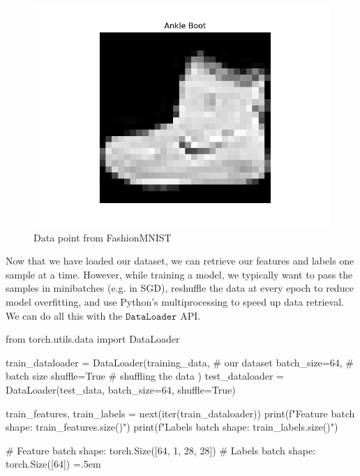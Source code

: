 \documentclass{article}
\newenvironment{cverbatim}
    {\SaveVerbatim{cverb}}
    {\endSaveVerbatim
      \flushleft\fboxrule=0pt\fboxsep=.5em
      \colorbox{cverbbg}{%
        \makebox[\dimexpr\linewidth-2\fboxsep][l]{\BUseVerbatim{cverb}}%
      }
      \endflushleft
  }
\theoremstyle{definition}
\theoremstyle{remark}
\theoremstyle{definition}
\begin{document}
        \begin{figure}
            \centering
            \includegraphics[scale=0.4]{img/PyTorch/fashion.png}
            \caption{Data point from FashionMNIST}
            \label{fig:fashionmnist_data}
      \end{figure}

      Now that we have loaded our dataset, we can retrieve our features and labels one sample at a time. However, while training a model, we typically want to pass the samples in minibatches (e.g. in SGD), reshuffle the data at every epoch to reduce model overfitting, and use Python's multiprocessing to speed up data retrieval. We can do all this with the $\texttt{DataLoader}$ API. 

      \begin{cverbatim}
        from torch.utils.data import DataLoader

        train_dataloader = DataLoader(training_data,    # our dataset
                                    batch_size=64,    # batch size
                                    shuffle=True      # shuffling the data
                                  )
        test_dataloader = DataLoader(test_data, batch_size=64, shuffle=True)

        train_features, train_labels = next(iter(train_dataloader))
        print(f"Feature batch shape: {train_features.size()}")
        print(f"Labels batch shape: {train_labels.size()}")

        # Feature batch shape: torch.Size([64, 1, 28, 28])
        # Labels batch shape: torch.Size([64])
      \end{cverbatim}
\end{document}
